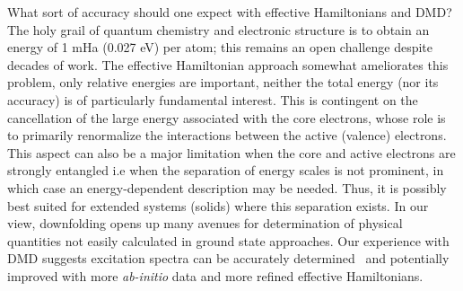 What sort of accuracy should one expect with effective Hamiltonians and DMD? The holy grail of quantum chemistry 
and electronic structure is to obtain an energy of 1 mHa (0.027 eV) per atom; this 
remains an open challenge despite decades of work. The effective Hamiltonian approach somewhat ameliorates 
this problem, only relative energies are important, neither the total energy (nor its accuracy) is of particularly 
fundamental interest. This is contingent on the cancellation of the large energy associated with the core electrons, 
whose role is to primarily renormalize the interactions between the active (valence) electrons. This aspect can also 
be a major limitation when the core and active electrons are strongly entangled i.e when the separation of energy 
scales is not prominent, in which case an energy-dependent description may be needed. 
Thus, it is possibly best suited for extended systems (solids) where this separation exists. 
In our view, downfolding opens up many avenues for determination of physical 
quantities not easily calculated in ground state approaches. Our experience with DMD 
suggests excitation spectra can be accurately determined~\cite{Changlani2015} and potentially improved with 
more \emph{ab-initio} data and more refined effective Hamiltonians.  

